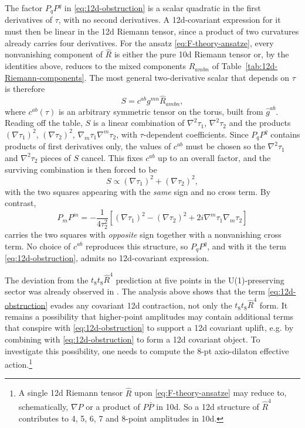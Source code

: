 The factor $P_q P^q$ in \eqref{eq:12d-obstruction} is a scalar quadratic in the first derivatives of $\tau$, with no second derivatives. 
A 12d-covariant expression for it must then be linear in the 12d Riemann tensor, since a product of two curvatures already carries four derivatives. 
For the ansatz \eqref{eq:F-theory-ansatze}, every nonvanishing component of $\widehat{R}$ is either the pure 10d Riemann tensor or, by the identities above, reduces to the mixed components $\widehat{R}_{ambn}$ of Table~\ref{tab:12d-Riemann-components}. 
The most general two-derivative scalar that depends on $\tau$ is therefore
\begin{equation}
S = c^{ab}  g^{mn} \widehat{R}_{ambn},
\end{equation}
where $c^{ab}(\tau)$ is an arbitrary symmetric tensor on the torus, built from $\widehat{g}^{ab}$. 
Reading off the table, $S$ is a linear combination of $\nabla^2\tau_1$, $\nabla^2\tau_2$ and the products 
$(\nabla\tau_1)^2$, $(\nabla\tau_2)^2$, $\nabla_m\tau_1\nabla^m\tau_2$, with $\tau$-dependent coefficients. 
Since $P_q P^q$ contains products of first derivatives only, the values of $c^{ab}$ must be chosen so the $\nabla^2\tau_1$ and $\nabla^2\tau_2$ pieces of $S$ cancel. 
This fixes $c^{ab}$ up to an overall factor, and the surviving combination is then forced to be
\begin{equation}
S \propto (\nabla\tau_1)^2 + (\nabla\tau_2)^2,
\end{equation}
with the two squares appearing with the \emph{same} sign and no cross term. 
By contrast,
\begin{equation}
P_m P^m = -\frac{1}{4\tau_2^2}
\left[
    (\nabla\tau_1)^2 - (\nabla\tau_2)^2 + 2i \nabla^m \tau_1 \nabla_m \tau_2
\right]
\label{eq:PP-real}
\end{equation}
carries the two squares with \emph{opposite} sign together with a nonvanishing cross term. 
No choice of $c^{ab}$ reproduces this structure, so $P_q P^q$, and with it the term \eqref{eq:12d-obstruction}, admits no 12d-covariant expression.

The deviation from the $t_8 t_8 \widehat{R}^4$ prediction at five points in the U(1)-preserving sector was already observed in \cite{Liu:2025uqu}. The analysis above shows that the term \eqref{eq:12d-obstruction} evades any covariant 12d contraction, not only the $t_8 t_8 \widehat{R}^4$ form.
It remains a possibility that higher-point amplitudes may contain additional terms that conspire with \eqref{eq:12d-obstruction} to support a 12d covariant uplift, e.g. by combining with \eqref{eq:12d-obstruction} to form a 12d covariant object.
To investigate this possibility, one needs to compute the 8-pt axio-dilaton effective action.\footnote{A single 12d Riemann tensor $\widehat{R}$ upon \eqref{eq:F-theory-ansatze} may reduce to, schematically, $\nabla P$ or a product of $P \bar{P}$ in 10d.
So a 12d structure of $\widehat{R}^4$ contributes to 4, 5, 6, 7 and 8-point amplitudes in 10d.}

